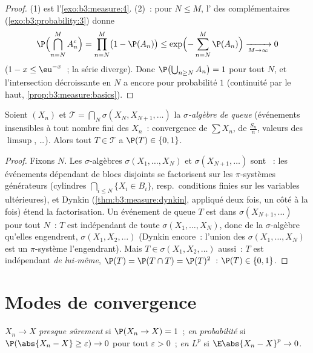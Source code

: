 \begin{proof}
(1) est l'\cref{exo:b3:measure:4}. (2)~: pour $N \leq M$,
l' des complémentaires
(\cref{exo:b3:probability:3}) donne
\[
\P\Bigl(\bigcap_{n=N}^{M}A_n^c\Bigr) = \prod_{n=N}^M\bigl(1
- \P(A_n)\bigr) \leq
\exp\Bigl(-\sum_{n=N}^M\P(A_n)\Bigr) \xrightarrow[M \to
\infty]{} 0
\]
($1 - x \leq \eu^{-x}$~; la série diverge). Donc
$\P\bigl(\bigcup_{n\geq N}A_n\bigr) = 1$ pour tout $N$, et
l'intersection décroissante en $N$ a encore pour
probabilité $1$ (continuité par le haut,
\cref{prop:b3:measure:basics}).
\end{proof}

\begin{theorem}
\label{thm:b3:probability:zeroone}
Soient $(X_n)$  et $\mathcal T =
\bigcap_N\sigma(X_N, X_{N+1}, \dots)$ la
\emph{$\sigma$-algèbre de queue} (événements insensibles à tout nombre fini des $X_n$~:
convergence de $\sum X_n$, de $\frac{S_n}n$, valeurs des
$\limsup$, \dots). Alors tout $T \in \mathcal T$ a $\P(T)
\in \{0, 1\}$.
\end{theorem}

\begin{proof}
Fixons $N$. Les $\sigma$-algèbres $\sigma(X_1, \dots, X_N)$
et $\sigma(X_{N+1}, \dots)$ sont ~: les
événements dépendant de blocs disjoints se factorisent sur
les $\pi$-systèmes générateurs (cylindres
$\bigcap_{i\leq N}\{X_i \in B_i\}$, resp.\ conditions
finies sur les variables ultérieures), et Dynkin
(\cref{thm:b3:measure:dynkin}, appliqué deux fois, un côté à
la fois) étend la factorisation. Un événement de queue $T$
est dans $\sigma(X_{N+1}, \dots)$ pour tout $N$~: $T$ est
indépendant de toute $\sigma(X_1, \dots, X_N)$, donc de la
$\sigma$-algèbre qu'elles engendrent, $\sigma(X_1, X_2,
\dots)$ (Dynkin encore~: l'union des $\sigma(X_1,\dots,X_N)$
est un $\pi$-système l'engendrant). Mais $T \in \sigma(X_1,
X_2, \dots)$ aussi~: $T$ est indépendant \emph{de
lui-même}, $\P(T) = \P(T\cap T) = \P(T)^2$~: $\P(T) \in
\{0, 1\}$.
\end{proof}

\section{Modes de convergence}

\begin{definition}\label{def:b3:probability:modes}
$X_n \to X$ \emph{presque sûrement} si $\P(X_n \to X) =
1$~; \emph{en probabilité} si $\P(\abs{X_n - X} \geq
\varepsilon) \to 0$ pour tout $\varepsilon > 0$~; \emph{en
$L^p$} si $\E\abs{X_n - X}^p \to 0$.
\end{definition}

